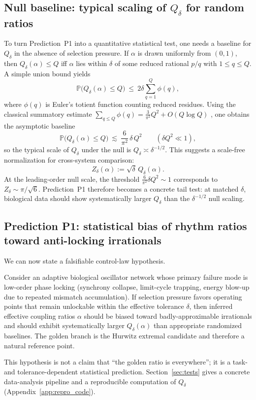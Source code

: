 \subsection{Null baseline: typical scaling of \texorpdfstring{$Q_\delta$}{Qdelta} for random ratios}
\label{sec:qdelta_baseline}

To turn Prediction~P1 into a quantitative statistical test, one needs a baseline for $Q_\delta$ in the absence of selection pressure.
If $\alpha$ is drawn uniformly from $(0,1)$, then $Q_\delta(\alpha)\le Q$ iff $\alpha$ lies within $\delta$ of some reduced rational $p/q$ with $1\le q\le Q$.
A simple union bound yields
\begin{equation}
  \mathbb{P}\bigl(Q_\delta(\alpha)\le Q\bigr)
  \ \le\ 2\delta\sum_{q=1}^{Q}\phi(q),
  \label{eq:qdelta_union_bound}
\end{equation}
where $\phi(q)$ is Euler's totient function counting reduced residues.
Using the classical summatory estimate $\sum_{q\le Q}\phi(q)=\frac{3}{\pi^2}Q^2+O(Q\log Q)$ \cite{HardyWright2008}, one obtains the asymptotic baseline
\begin{equation}
  \mathbb{P}\bigl(Q_\delta(\alpha)\le Q\bigr)
  \ \lesssim\ \frac{6}{\pi^2}\,\delta\,Q^2
  \qquad (\delta Q^2\ll 1),
  \label{eq:qdelta_baseline_scaling}
\end{equation}
so the typical scale of $Q_\delta$ under the null is $Q_\delta \asymp \delta^{-1/2}$.
This suggests a scale-free normalization for cross-system comparison:
\begin{equation}
  Z_\delta(\alpha) := \sqrt{\delta}\,Q_\delta(\alpha).
  \label{eq:Zdelta_def}
\end{equation}
At the leading-order null scale, the threshold $\frac{6}{\pi^2}\delta Q^2\sim 1$ corresponds to $Z_\delta\sim \pi/\sqrt{6}$.
Prediction~P1 therefore becomes a concrete tail test: at matched $\delta$, biological data should show systematically larger $Q_\delta$ than the $\delta^{-1/2}$ null scaling.

\subsection{Prediction P1: statistical bias of rhythm ratios toward anti-locking irrationals}
\label{sec:P1}

We can now state a falsifiable control-law hypothesis.

\begin{remark}
\label{rem:control_law}
Consider an adaptive biological oscillator network whose primary failure mode is low-order phase locking (synchrony collapse, limit-cycle trapping, energy blow-up due to repeated mismatch accumulation).
If selection pressure favors operating points that remain unlockable within the effective tolerance $\delta$, then inferred effective coupling ratios $\alpha$ should be biased toward badly-approximable irrationals and should exhibit systematically larger $Q_\delta(\alpha)$ than appropriate randomized baselines.
The golden branch is the Hurwitz extremal candidate and therefore a natural reference point.
\end{remark}

This hypothesis is not a claim that ``the golden ratio is everywhere''; it is a task- and tolerance-dependent statistical prediction.
Section~\ref{sec:tests} gives a concrete data-analysis pipeline and a reproducible computation of $Q_\delta$ (Appendix~\ref{app:repro_code}).


